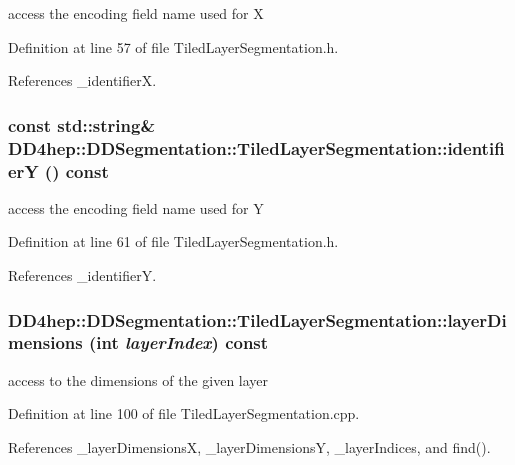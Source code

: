 access the encoding field name used for X 

Definition at line 57 of file TiledLayerSegmentation.h.

References \_\-identifierX.\hypertarget{class_d_d4hep_1_1_d_d_segmentation_1_1_tiled_layer_segmentation_a75781ecca4bd534b4fa4d8bcd50089db}{
\subsubsection[{identifierY}]{\setlength{\rightskip}{0pt plus 5cm}const std::string\& DD4hep::DDSegmentation::TiledLayerSegmentation::identifierY () const}}
\label{class_d_d4hep_1_1_d_d_segmentation_1_1_tiled_layer_segmentation_a75781ecca4bd534b4fa4d8bcd50089db}


access the encoding field name used for Y 

Definition at line 61 of file TiledLayerSegmentation.h.

References \_\-identifierY.\hypertarget{class_d_d4hep_1_1_d_d_segmentation_1_1_tiled_layer_segmentation_a9eed70ede18e3595af6330f70cdcb60f}{
\subsubsection[{layerDimensions}]{ DD4hep::DDSegmentation::TiledLayerSegmentation::layerDimensions (int {\em layerIndex}) const}}
\label{class_d_d4hep_1_1_d_d_segmentation_1_1_tiled_layer_segmentation_a9eed70ede18e3595af6330f70cdcb60f}


access to the dimensions of the given layer 

Definition at line 100 of file TiledLayerSegmentation.cpp.

References \_\-layerDimensionsX, \_\-layerDimensionsY, \_\-layerIndices, and find().

